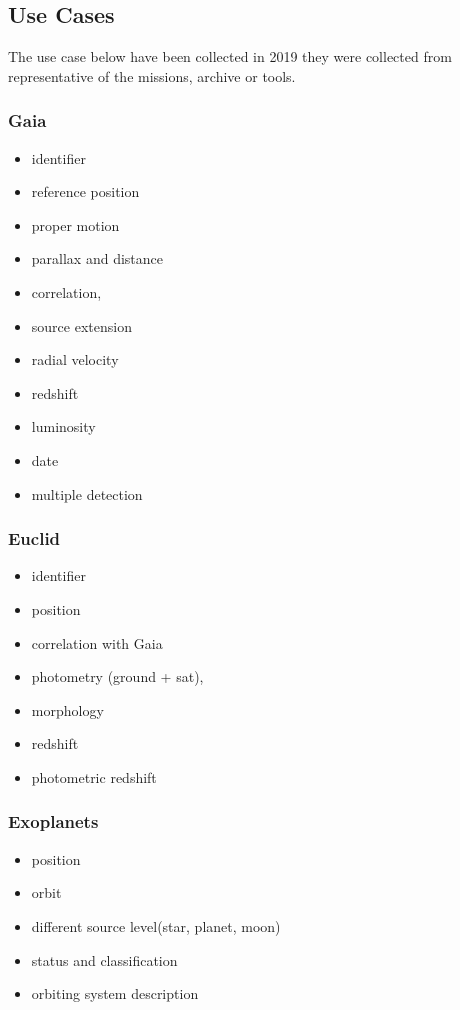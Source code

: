 \documentclass[11pt,a4paper]{ivoa}
\begin{document}
\subsection{Use Cases}
The use case below have been collected in 2019 they were collected from representative of the missions, archive or tools.

\subsubsection{Gaia}
\begin{itemize}
    \item identifier
    \item reference position
    \item proper motion
    \item parallax and distance
    \item correlation,
    \item source extension
    \item radial velocity
    \item redshift
    \item luminosity
    \item date
    \item multiple detection
\end{itemize}


\subsubsection{Euclid}
\begin{itemize}    
    \item identifier
    \item position
    \item correlation with Gaia
    \item photometry (ground + sat),
    \item morphology
    \item redshift
    \item photometric redshift
\end{itemize}

\subsubsection{Exoplanets}
\begin{itemize}
    \item position
    \item orbit
    \item different source level(star, planet, moon)
    \item status and classification
    \item orbiting system description
\end{itemize}
\end{document}

